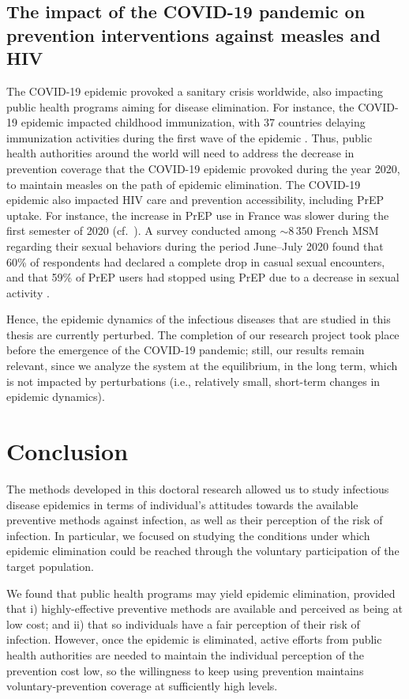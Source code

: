 \subsection{The impact of the COVID-19 pandemic on prevention interventions against measles and HIV}
The COVID-19 epidemic provoked a sanitary crisis worldwide, also impacting public health programs aiming for disease elimination. For instance, the COVID-19 epidemic impacted childhood immunization, with 37 countries delaying immunization activities during the first wave of the epidemic \cite[]{WHO_CovidMeasles}. Thus, public health authorities around the world will need to address the decrease in prevention coverage that the COVID-19 epidemic provoked during the year 2020, to maintain measles on the path of epidemic elimination. The COVID-19 epidemic also impacted HIV care and prevention accessibility, including PrEP uptake. For instance, the increase in PrEP use in France was slower during the first semester of 2020 (cf.~). A survey conducted among $\sim8\,350$ French MSM regarding their sexual behaviors during the period June--July 2020 found that 60\% of respondents had declared a complete drop in casual sexual encounters, and that 59\% of PrEP users had stopped using PrEP due to a decrease in sexual activity \cite[]{Velter2020}. 

Hence, the epidemic dynamics of the infectious diseases that are studied in this thesis are currently perturbed. The completion of our research project took place before the emergence of the COVID-19 pandemic; still, our results remain relevant, since we analyze the system at the equilibrium, in the long term, which is not impacted by perturbations (i.e., relatively small, short-term changes in epidemic dynamics). 

\section{Conclusion}
The methods developed in this doctoral research allowed us to study infectious disease epidemics in terms of individual's attitudes towards the available preventive methods against infection, as well as their perception of the risk of infection. In particular, we focused on studying the conditions under which epidemic elimination could be reached through the voluntary participation of the target population.

We found that public health programs may yield epidemic elimination, provided that i) highly-effective preventive methods are available and perceived as being at low cost; and ii) that so individuals have a fair perception of their risk of infection. However, once the epidemic is eliminated, active efforts from public health authorities are needed to maintain the individual perception of the prevention cost low, so the willingness to keep using prevention maintains voluntary-prevention coverage at sufficiently high levels.

